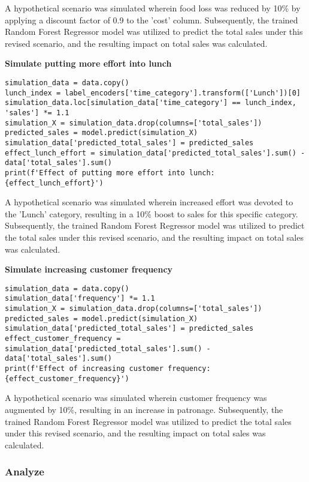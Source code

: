 A hypothetical scenario was simulated wherein food loss was reduced by 10\% by applying a discount factor of 0.9 to the 'cost' column. Subsequently, the trained Random Forest Regressor model was utilized to predict the total sales under this revised scenario, and the resulting impact on total sales was calculated.

\textbf{Simulate putting more effort into lunch}

\begin{lstlisting}
simulation_data = data.copy()
lunch_index = label_encoders['time_category'].transform(['Lunch'])[0]
simulation_data.loc[simulation_data['time_category'] == lunch_index, 'sales'] *= 1.1
simulation_X = simulation_data.drop(columns=['total_sales'])
predicted_sales = model.predict(simulation_X)
simulation_data['predicted_total_sales'] = predicted_sales
effect_lunch_effort = simulation_data['predicted_total_sales'].sum() - data['total_sales'].sum()
print(f'Effect of putting more effort into lunch: {effect_lunch_effort}')
\end{lstlisting}

A hypothetical scenario was simulated wherein increased effort was devoted to the 'Lunch' category, resulting in a 10\% boost to sales for this specific category. Subsequently, the trained Random Forest Regressor model was utilized to predict the total sales under this revised scenario, and the resulting impact on total sales was calculated.

\textbf{Simulate increasing customer frequency}

\begin{lstlisting}
simulation_data = data.copy()
simulation_data['frequency'] *= 1.1
simulation_X = simulation_data.drop(columns=['total_sales'])
predicted_sales = model.predict(simulation_X)
simulation_data['predicted_total_sales'] = predicted_sales
effect_customer_frequency = simulation_data['predicted_total_sales'].sum() - data['total_sales'].sum()
print(f'Effect of increasing customer frequency: {effect_customer_frequency}')
\end{lstlisting}

A hypothetical scenario was simulated wherein customer frequency was augmented by 10\%, resulting in an increase in patronage. Subsequently, the trained Random Forest Regressor model was utilized to predict the total sales under this revised scenario, and the resulting impact on total sales was calculated.

\subsubsection{ Analyze }


